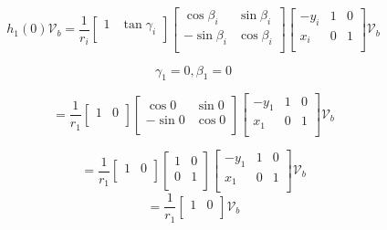 \documentclass{article}
\begin{document}
\begin{equation}
    h_1(0) \mathcal{V}_b = \frac{1}{r_i} \left[\begin{array}{cc}
            1 & \tan\gamma_i \\
        \end{array}\right]
    \left[\begin{array}{cc}
            \cos \beta_i  & \sin \beta_i \\
            -\sin \beta_i & \cos \beta_i \\
        \end{array}\right]
    \begin{bmatrix}
        -y_i & 1 & 0 \\
        x_i  & 0 & 1 \\
    \end{bmatrix} \mathcal{V}_b
\end{equation}

\begin{equation}
    \gamma_1 = 0, \beta_1 = 0
\end{equation}

\begin{equation}
    = \frac{1}{r_1} \left[\begin{array}{cc}
            1 & 0 \\
        \end{array}\right]
    \left[\begin{array}{cc}
            \cos 0  & \sin 0 \\
            -\sin 0 & \cos 0 \\
        \end{array}\right]
    \begin{bmatrix}
        -y_1 & 1 & 0 \\
        x_1  & 0 & 1 \\
    \end{bmatrix}
    \mathcal{V}_b
\end{equation}

\begin{equation}
    = \frac{1}{r_1} \left[\begin{array}{cc}
            1 & 0 \\
        \end{array}\right]
    \left[
        \begin{array}{cc}
            1 & 0 \\
            0 & 1 \\
        \end{array}\right]
    \begin{bmatrix}
        -y_1 & 1 & 0 \\
        x_1  & 0 & 1 \\
    \end{bmatrix}
    \mathcal{V}_b
\end{equation}
\begin{equation}
    = \frac{1}{r_1}
    \left[
        \begin{array}{cc}
            1 & 0 \\
        \end{array}\right]
    \mathcal{V}_b
\end{equation}
\end{document}
